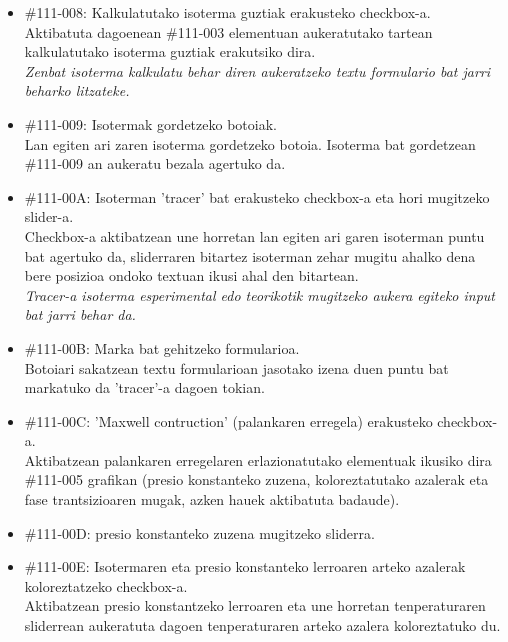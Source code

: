 \documentclass[10pt,a4paper]{article}
\let\nf\normalfont %
\newcommand{\cf}{\normalfont\sffamily}
\begin{document}
\begin{itemize}
\item \cf \#111-008: Kalkulatutako isoterma guztiak erakusteko checkbox-a.
\\
\nf Aktibatuta dagoenean \cf \#111-003 \nf elementuan aukeratutako tartean kalkulatutako isoterma guztiak erakutsiko dira.
\\

\textit{Zenbat isoterma kalkulatu behar diren aukeratzeko textu formulario bat jarri beharko litzateke.}

\item \cf \#111-009: Isotermak gordetzeko botoiak.
\\
\nf Lan egiten ari zaren isoterma gordetzeko botoia. Isoterma bat gordetzean \cf \#111-009 \nf an aukeratu bezala agertuko da.

\item \cf \#111-00A: Isoterman 'tracer' bat erakusteko checkbox-a eta hori mugitzeko slider-a.
\\
\nf Checkbox-a aktibatzean une horretan lan egiten ari garen isoterman puntu bat agertuko da, sliderraren bitartez isoterman zehar mugitu ahalko dena bere posizioa ondoko textuan ikusi ahal den bitartean.
\\

\textit{Tracer-a isoterma esperimental edo teorikotik mugitzeko aukera egiteko input bat jarri behar da.}

\item \cf \#111-00B: Marka bat gehitzeko formularioa.
\\
\nf Botoiari sakatzean textu formularioan jasotako izena duen puntu bat markatuko da 'tracer'-a dagoen tokian.
\\

\item \cf \#111-00C: 'Maxwell contruction' (palankaren erregela) erakusteko checkbox-a.
\\
\nf Aktibatzean palankaren erregelaren erlazionatutako elementuak ikusiko dira \cf \#111-005 \nf grafikan (presio konstanteko zuzena, koloreztatutako azalerak eta fase trantsizioaren mugak, azken hauek aktibatuta badaude).

\item \cf \#111-00D: presio konstanteko zuzena mugitzeko sliderra.
\\
\nf

\item \cf \#111-00E: Isotermaren eta presio konstanteko lerroaren arteko azalerak koloreztatzeko checkbox-a.
\\
\nf Aktibatzean presio konstantzeko lerroaren eta une horretan tenperaturaren sliderrean aukeratuta dagoen tenperaturaren arteko azalera koloreztatuko du.


\end{itemize}
\end{document}
